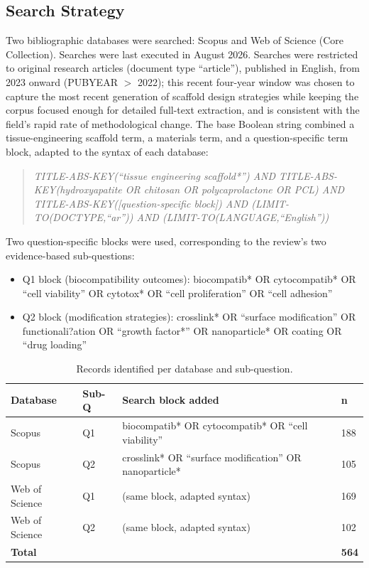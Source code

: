 \documentclass[5p,times,twocolumn]{elsarticle}
\begin{document}
\subsection{Search Strategy}
\label{sec:search}

Two bibliographic databases were searched: Scopus and Web of Science (Core Collection). Searches were last executed in August 2026. Searches were restricted to original research articles (document type ``article''), published in English, from 2023 onward (PUBYEAR $>$ 2022); this recent four-year window was chosen to capture the most recent generation of scaffold design strategies while keeping the corpus focused enough for detailed full-text extraction, and is consistent with the field's rapid rate of methodological change. The base Boolean string combined a tissue-engineering scaffold term, a materials term, and a question-specific term block, adapted to the syntax of each database:

\begin{quote}
\textit{TITLE-ABS-KEY(``tissue engineering scaffold*'') AND TITLE-ABS-KEY(hydroxyapatite OR chitosan OR polycaprolactone OR PCL) AND TITLE-ABS-KEY([question-specific block]) AND (LIMIT-TO(DOCTYPE,``ar'')) AND (LIMIT-TO(LANGUAGE,``English''))}
\end{quote}

Two question-specific blocks were used, corresponding to the review's two evidence-based sub-questions:
\begin{itemize}
\item Q1 block (biocompatibility outcomes): biocompatib* OR cytocompatib* OR ``cell viability'' OR cytotox* OR ``cell proliferation'' OR ``cell adhesion''
\item Q2 block (modification strategies): crosslink* OR ``surface modification'' OR functionali?ation OR ``growth factor*'' OR nanoparticle* OR coating OR ``drug loading''
\end{itemize}

\begin{table}[h]
\caption{Records identified per database and sub-question.}
\label{tab:search}
\small
\begin{tabular}{p{1.6cm}p{1.2cm}p{3cm}p{1.3cm}}
\hline
\textbf{Database} & \textbf{Sub-Q} & \textbf{Search block added} & \textbf{n} \\
\hline
Scopus & Q1 & biocompatib* OR cytocompatib* OR ``cell viability'' & 188 \\
Scopus & Q2 & crosslink* OR ``surface modification'' OR nanoparticle* & 105 \\
Web of Science & Q1 & (same block, adapted syntax) & 169 \\
Web of Science & Q2 & (same block, adapted syntax) & 102 \\
\hline
\textbf{Total} & & & \textbf{564} \\
\hline
\end{tabular}
\end{table}
\end{document}
